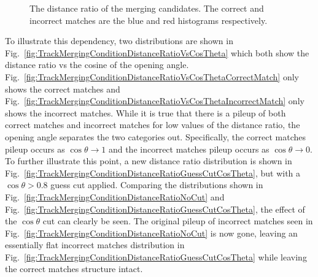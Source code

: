 \begin{figure}
  \centering
  \caption{The distance ratio of the merging candidates.  The correct and incorrect matches are the blue and red histograms respectively.}
  \label{fig:TrackMergingConditionDistanceRatio}
\end{figure}
To illustrate this dependency, two distributions are shown in Fig.~\ref{fig:TrackMergingConditionDistanceRatioVsCosTheta} which both show the distance ratio vs the cosine of the opening angle.  Fig.~\ref{fig:TrackMergingConditionDistanceRatioVsCosThetaCorrectMatch} only shows the correct matches and Fig.~\ref{fig:TrackMergingConditionDistanceRatioVsCosThetaIncorrectMatch} only shows the incorrect matches.  While it is true that there is a pileup of both correct matches and incorrect matches for low values of the distance ratio, the opening angle separates the two categories out.  Specifically, the correct matches pileup occurs as $\cos\theta \rightarrow 1$ and the incorrect matches pileup occurs as $\cos\theta \rightarrow 0$.  To further illustrate this point, a new distance ratio distribution is shown in Fig.~\ref{fig:TrackMergingConditionDistanceRatioGuessCutCosTheta}, but with a $\cos\theta > 0.8$ guess cut applied.  Comparing the distributions shown in Fig.~\ref{fig:TrackMergingConditionDistanceRatioNoCut} and Fig.~\ref{fig:TrackMergingConditionDistanceRatioGuessCutCosTheta}, the effect of the $\cos\theta$ cut can clearly be seen.  The original pileup of incorrect matches seen in Fig.~\ref{fig:TrackMergingConditionDistanceRatioNoCut} is now gone, leaving an essentially flat incorrect matches distribution in Fig.~\ref{fig:TrackMergingConditionDistanceRatioGuessCutCosTheta} while leaving the correct matches structure intact.  
